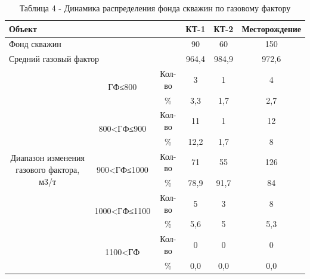 \begin{table}[H]
\caption*{Таблица 4 - Динамика распределения фонда скважин по газовому фактору}
\centering
\begin{tabular}{|ccc|c|c|c|}
\hline
\multicolumn{3}{|l|}{Объект} & КТ-1 & КТ-2 & Месторождение \\ \hline
\multicolumn{3}{|l|}{Фонд скважин} & 90 & 60 & 150 \\ \hline
\multicolumn{3}{|l|}{Средний газовый фактор} & 964,4 & 984,9 & 972,6 \\ \hline
\multicolumn{1}{|p{0.2\textwidth}|}{\multirow{10}{=}{Диапазон изменения газового фактора, м3/т}} & \multicolumn{1}{c|}{\multirow{2}{*}{ГФ≤800}} & Кол-во & 3 & 1 & 4 \\ \cline{3-6} 
\multicolumn{1}{|l|}{} & \multicolumn{1}{c|}{} & \% & 3,3 & 1,7 & 2,7 \\ \cline{2-6} 
\multicolumn{1}{|l|}{} & \multicolumn{1}{c|}{\multirow{2}{*}{800<ГФ≤900}} & Кол-во & 11 & 1 & 12 \\ \cline{3-6} 
\multicolumn{1}{|l|}{} & \multicolumn{1}{c|}{} & \% & 12,2 & 1,7 & 8 \\ \cline{2-6} 
\multicolumn{1}{|l|}{} & \multicolumn{1}{c|}{\multirow{2}{*}{900<ГФ≤1000}} & Кол-во & 71 & 55 & 126 \\ \cline{3-6} 
\multicolumn{1}{|l|}{} & \multicolumn{1}{c|}{} & \% & 78,9 & 91,7 & 84 \\ \cline{2-6} 
\multicolumn{1}{|l|}{} & \multicolumn{1}{c|}{\multirow{2}{*}{1000<ГФ≤1100}} & Кол-во & 5 & 3 & 8 \\ \cline{3-6} 
\multicolumn{1}{|l|}{} & \multicolumn{1}{c|}{} & \% & 5,6 & 5 & 5,3 \\ \cline{2-6} 
\multicolumn{1}{|l|}{} & \multicolumn{1}{c|}{\multirow{2}{*}{1100<ГФ}} & Кол-во & 0 & 0 & 0 \\ \cline{3-6} 
\multicolumn{1}{|l|}{} & \multicolumn{1}{c|}{} & \% & 0,0 & 0,0 & 0,0 \\ \hline
\end{tabular}
\end{table}

